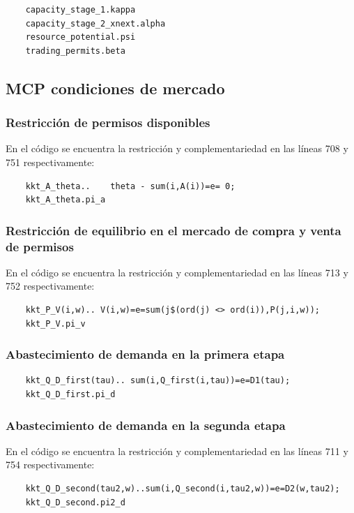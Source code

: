 \begin{verbatim}
    capacity_stage_1.kappa
    capacity_stage_2_xnext.alpha
    resource_potential.psi
    trading_permits.beta
\end{verbatim}

\subsection{MCP condiciones de mercado}

\subsubsection{Restricción de permisos disponibles}
En el código se encuentra la restricción y complementariedad en las líneas 708 y 751 respectivamente: 
\begin{verbatim}
    kkt_A_theta..    theta - sum(i,A(i))=e= 0;
    kkt_A_theta.pi_a
\end{verbatim}

\subsubsection{Restricción de equilibrio en el mercado de compra y venta de permisos}
En el código se encuentra la restricción y complementariedad en las líneas 713 y 752 respectivamente: 
\begin{verbatim}
    kkt_P_V(i,w).. V(i,w)=e=sum(j$(ord(j) <> ord(i)),P(j,i,w));
    kkt_P_V.pi_v 
\end{verbatim}

\subsubsection{Abastecimiento de demanda en la primera etapa}
\begin{verbatim}
    kkt_Q_D_first(tau).. sum(i,Q_first(i,tau))=e=D1(tau);
    kkt_Q_D_first.pi_d
\end{verbatim}

\subsubsection{Abastecimiento de demanda en la segunda etapa}
En el código se encuentra la restricción y complementariedad en las líneas 711 y 754 respectivamente: 
\begin{verbatim}
    kkt_Q_D_second(tau2,w)..sum(i,Q_second(i,tau2,w))=e=D2(w,tau2);
    kkt_Q_D_second.pi2_d
\end{verbatim}


